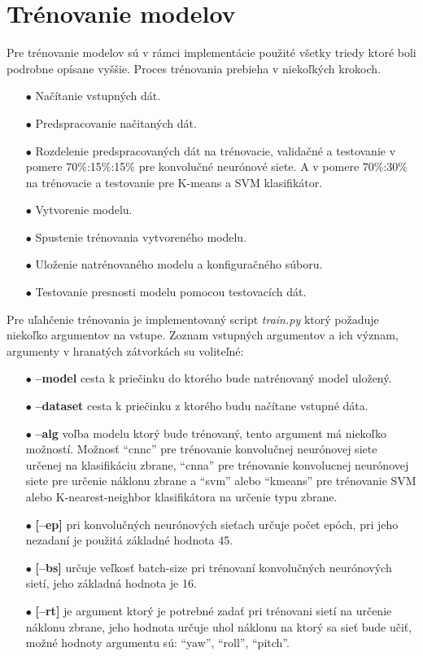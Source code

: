 
\section{Trénovanie modelov}
\label{sec:trenovanie}
Pre trénovanie modelov sú v rámci implementácie použité všetky triedy ktoré boli podrobne opísane vyššie.
Proces trénovania prebieha v niekoľkých krokoch.
\begin{enumerate}
    \item[$\bullet$] Načítanie vstupných dát.
    \item[$\bullet$] Predspracovanie načitaných dát.
    \item[$\bullet$] Rozdelenie predspracovaných dát na trénovacie, validačné a testovanie v pomere 70\%:15\%:15\% pre konvolučné neurónové siete.
    A v pomere 70\%:30\% na trénovacie a testovanie pre K-means a SVM klasifikátor.
    \item[$\bullet$] Vytvorenie modelu.
    \item[$\bullet$] Spustenie trénovania vytvoreného modelu.
    \item[$\bullet$] Uloženie natrénovaného modelu a konfiguračného súboru.
    \item[$\bullet$] Testovanie presnosti modelu pomocou testovacích dát.
\end{enumerate}

Pre uľahčenie trénovania je implementovaný script \textit{train.py} ktorý požaduje niekoľko argumentov na vstupe.
Zoznam vstupných argumentov a ich význam, argumenty v hranatých zátvorkách su voliteľné:
\begin{enumerate}
  \item[$\bullet$] \textbf{--model} cesta k priečinku do ktorého bude natrénovaný model uložený.
  \item[$\bullet$] \textbf{--dataset} cesta k priečinku z ktorého budu načítane vstupné dáta.
  \item[$\bullet$] \textbf{--alg} voľba modelu ktorý bude trénovaný, tento argument má niekoľko možností.
  Možnosť ``cnnc'' pre trénovanie konvolučnej neurónovej siete určenej na klasifikáciu zbrane,
  ``cnna'' pre trénovanie konvolucnej neurónovej siete pre určenie náklonu zbrane a
  ``svm'' alebo ``kmeans'' pre trénovanie SVM alebo K-nearest-neighbor klasifikátora na určenie typu zbrane.
  \item[$\bullet$] \textbf{[--ep]} pri konvolučných neurónových sieťach určuje počet epóch, pri jeho nezadaní je použitá
  základné hodnota 45.
  \item[$\bullet$] \textbf{[--bs]} určuje veľkosť batch-size pri trénovaní konvolučných neurónových sietí, jeho
  základná hodnota je 16.
  \item[$\bullet$] \textbf{[--rt]} je argument ktorý je potrebné zadať pri trénovani sietí na určenie náklonu zbrane,
  jeho hodnota určuje uhol náklonu na ktorý sa sieť bude učiť, možné hodnoty argumentu sú: ``yaw'', ``roll'', ``pitch''.
\end{enumerate}

